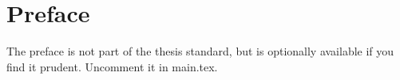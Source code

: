 \chapter*{Preface}
The preface is not part of the thesis standard, but is optionally available if you find it prudent. Uncomment it in main.tex.
